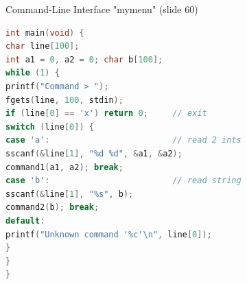 \begin{examplecode}{Command-Line Interface "mymenu" (slide 60)}
\begin{lstlisting}[language=C, style=basesmol, aboveskip=2pt, belowskip=2pt]
int main(void) {
char line[100];
int a1 = 0, a2 = 0; char b[100];
while (1) {
printf("Command > ");
fgets(line, 100, stdin);
if (line[0] == 'x') return 0;     // exit
switch (line[0]) {
case 'a':                         // read 2 ints
sscanf(&line[1], "%d %d", &a1, &a2);
command1(a1, a2); break;
case 'b':                         // read string
sscanf(&line[1], "%s", b);
command2(b); break;
default:
printf("Unknown command '%c'\n", line[0]);
}
}
}
\end{lstlisting}
\end{examplecode}

\raggedcolumns
